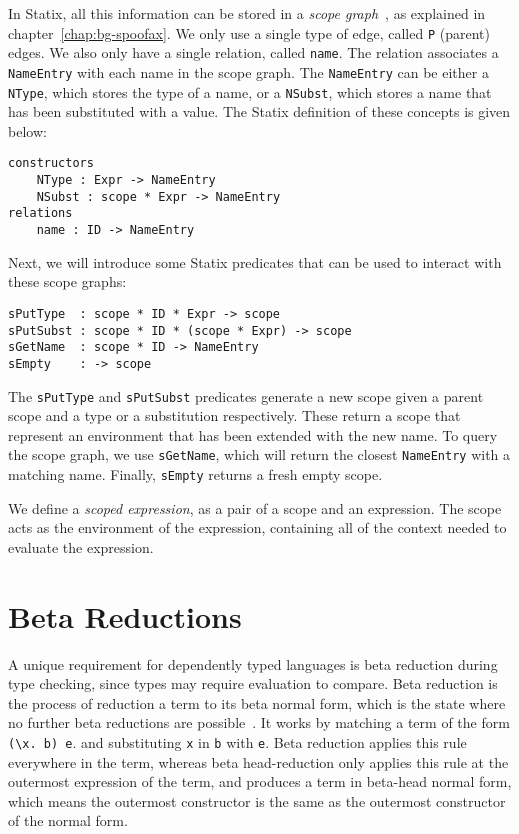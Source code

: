 In Statix, all this information can be stored in a \emph{scope graph}~\cite{scope_graphs}, as explained in chapter~\ref{chap:bg-spoofax}. We only use a single type of edge, called \verb|P| (parent) edges. We also only have a single relation, called \verb|name|. The relation associates a \verb|NameEntry| with each name in the scope graph. The \verb|NameEntry| can be either a \verb|NType|, which stores the type of a name, or a \verb|NSubst|, which stores a name that has been substituted with a value. The Statix definition of these concepts is given below:
\begin{lstlisting}
constructors
    NType : Expr -> NameEntry
    NSubst : scope * Expr -> NameEntry
relations
    name : ID -> NameEntry
\end{lstlisting}

Next, we will introduce some Statix predicates that can be used to interact with these scope graphs:

\begin{lstlisting}
sPutType  : scope * ID * Expr -> scope
sPutSubst : scope * ID * (scope * Expr) -> scope
sGetName  : scope * ID -> NameEntry
sEmpty    : -> scope
\end{lstlisting}
The \verb|sPutType| and \verb|sPutSubst| predicates generate a new scope given a parent scope and a type or a substitution respectively. These return a scope that represent an environment that has been extended with the new name. To query the scope graph, we use \verb|sGetName|, which will return the closest \verb|NameEntry| with a matching name. Finally, \verb|sEmpty| returns a fresh empty scope.

We define a \emph{scoped expression}, as a pair of a scope and an expression. The scope acts as the environment of the expression, containing all of the context needed to evaluate the expression.

\section{Beta Reductions}
\label{sec:coc-dynsyms}

A unique requirement for dependently typed languages is beta reduction during type checking, since types may require evaluation to compare. Beta reduction is the process of reduction a term to its beta normal form, which is the state where no further beta reductions are possible~\cite{tapl}. It works by matching a term of the form \verb|(\x. b) e|. and substituting \verb|x| in \verb|b| with \verb|e|. Beta reduction applies this rule everywhere in the term, whereas beta head-reduction only applies this rule at the outermost expression of the term, and produces a term in beta-head normal form, which means the outermost constructor is the same as the outermost constructor of the normal form.

